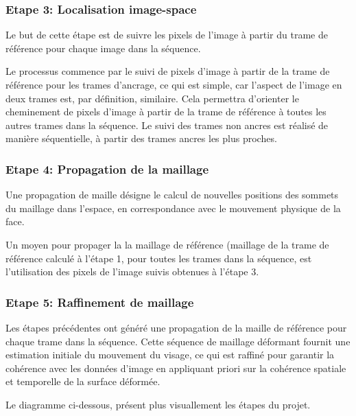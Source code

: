 \documentclass[a4paper,12pt]{article}
\begin{document}
\subsubsection*{Etape 3: Localisation image-space}
Le but de cette étape est de suivre les pixels de l'image à partir du
trame de référence pour chaque image dans la séquence.  

Le processus commence par le suivi de pixels d'image à partir de la
trame de référence pour les trames d'ancrage, ce qui est simple, car
l'aspect de l'image en deux trames est, par définition,
similaire. Cela permettra d'orienter le cheminement de pixels d'image
à partir de la trame de référence à toutes les autres trames dans la
séquence.  
Le suivi des trames non ancres est réalisé de manière séquentielle, à
partir des trames ancres les plus proches.

\subsubsection*{Etape 4: Propagation de la maillage}

Une propagation de maille désigne le calcul de nouvelles positions des
sommets du maillage dans l'espace, en correspondance avec le mouvement
physique de la face.

Un moyen pour propager la la maillage de référence (maillage de la
trame de référence calculé à l'étape 1, pour toutes les trames dans
la séquence, est l'utilisation des pixels de l'image suivis obtenues à
l'étape 3.
 
\subsubsection*{Etape 5: Raffinement de maillage}

Les étapes précédentes ont généré une propagation de la maille de
référence pour chaque trame dans la séquence. Cette séquence de
maillage déformant fournit une estimation initiale du mouvement du
visage, ce qui est raffiné pour garantir la cohérence avec les données
d'image en appliquant priori sur la cohérence spatiale et temporelle
de la surface déformée.

Le diagramme ci-dessous, présent plus visuallement les étapes du projet.
\end{document}
